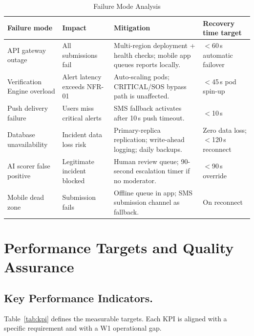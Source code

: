 \documentclass[12pt,a4paper]{article}
\begin{document}
\begin{table}[h]
\caption{Failure Mode Analysis}
\label{tab:failures}
\centering
\begin{tabularx}{\textwidth}{lXXX}
\toprule
\textbf{Failure mode} & \textbf{Impact} & \textbf{Mitigation} & \textbf{Recovery time target} \\
\midrule
API gateway outage & All submissions fail & Multi-region deployment + health checks; mobile app queues reports locally. & $<$60\,s automatic failover \\
Verification Engine overload & Alert latency exceeds NFR-01 & Auto-scaling pods; CRITICAL/SOS bypass path is unaffected. & $<$45\,s pod spin-up \\
Push delivery failure & Users miss critical alerts & SMS fallback activates after 10\,s push timeout. & $<$10\,s \\
Database unavailability & Incident data loss risk & Primary-replica replication; write-ahead logging; daily backups. & Zero data loss; $<$120\,s reconnect \\
AI scorer false positive & Legitimate incident blocked & Human review queue; 90-second escalation timer if no moderator. & $<$90\,s override \\
Mobile dead zone & Submission fails & Offline queue in app; SMS submission channel as fallback. & On reconnect \\
\bottomrule
\end{tabularx}
\end{table}

\section{Performance Targets and Quality Assurance}

\subsection{Key Performance Indicators.}
Table~\ref{tab:kpi} defines the measurable targets. Each KPI is
aligned with a specific requirement and with a W1 operational gap.
\end{document}
